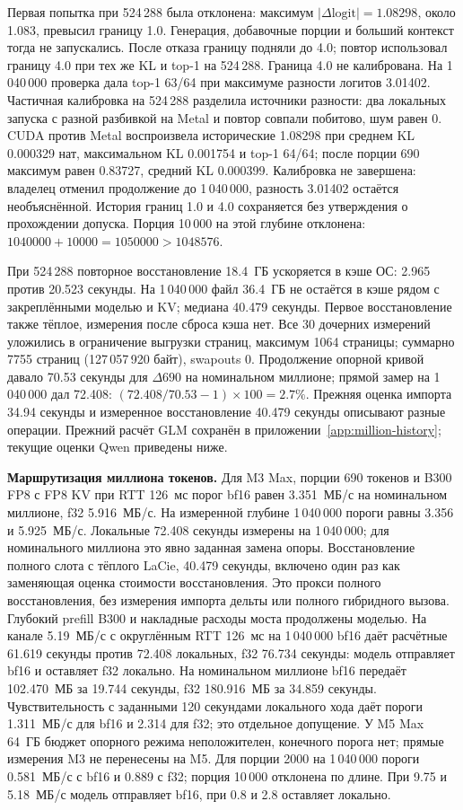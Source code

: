 Первая попытка при 524\,288 была отклонена: максимум $|\Delta\mathrm{logit}|=1.08298$, около 1.083,
превысил границу 1.0. Генерация, добавочные порции и больший контекст тогда не запускались.
После отказа границу подняли до 4.0; повтор использовал границу 4.0 при тех же KL и top-1 на 524\,288.
Граница 4.0 не калибрована. На 1\,040\,000 проверка дала top-1 63/64 при максимуме разности логитов 3.01402.
Частичная калибровка на 524\,288 разделила источники разности: два локальных запуска с разной разбивкой
на Metal и повтор совпали побитово, шум равен 0. CUDA против Metal воспроизвела исторические 1.08298
при среднем KL 0.000329 нат, максимальном KL 0.001754 и top-1 64/64;
после порции 690 максимум равен 0.83727, средний KL 0.000399.
Калибровка не завершена: владелец отменил продолжение до 1\,040\,000, разность 3.01402 остаётся необъяснённой.
История границ 1.0 и 4.0 сохраняется без утверждения о прохождении допуска.
Порция 10\,000 на этой глубине отклонена: $1040000+10000=1050000>1048576$.

При 524\,288 повторное восстановление 18.4~ГБ ускоряется в кэше ОС: 2.965 против 20.523 секунды.
На 1\,040\,000 файл 36.4~ГБ не остаётся в кэше рядом с закреплёнными моделью и KV; медиана 40.479 секунды.
Первое восстановление также тёплое, измерения после сброса кэша нет.
Все 30 дочерних измерений уложились в ограничение выгрузки страниц, максимум 1064 страницы;
суммарно 7755 страниц (127\,057\,920 байт), swapouts 0.
Продолжение опорной кривой давало 70.53 секунды для $\Delta690$ на номинальном миллионе;
прямой замер на 1\,040\,000 дал 72.408: $(72.408/70.53-1)\times100=2.7\%$.
Прежняя оценка импорта 34.94 секунды и измеренное восстановление 40.479 секунды описывают разные операции.
Прежний расчёт GLM сохранён в приложении~\ref{app:million-history}; текущие оценки Qwen приведены ниже.

\textbf{Маршрутизация миллиона токенов.} Для M3 Max, порции 690 токенов и B300 FP8 с FP8 KV
при RTT 126~мс порог bf16 равен 3.351~МБ/с на номинальном миллионе, f32 5.916~МБ/с.
На измеренной глубине 1\,040\,000 пороги равны 3.356 и 5.925~МБ/с.
Локальные 72.408 секунды измерены на 1\,040\,000; для номинального миллиона это явно заданная замена опоры.
Восстановление полного слота с тёплого LaCie, 40.479 секунды, включено один раз как заменяющая оценка стоимости восстановления.
Это прокси полного восстановления, без измерения импорта дельты или полного гибридного вызова.
Глубокий prefill B300 и накладные расходы моста продолжены моделью.
На канале 5.19~МБ/с с округлённым RTT 126~мс на 1\,040\,000 bf16 даёт расчётные 61.619 секунды против 72.408 локальных,
f32 76.734 секунды: модель отправляет bf16 и оставляет f32 локально.
На номинальном миллионе bf16 передаёт 102.470~МБ за 19.744 секунды, f32 180.916~МБ за 34.859 секунды.
Чувствительность с заданными 120 секундами локального хода даёт пороги 1.311~МБ/с для bf16 и 2.314 для f32;
это отдельное допущение. У M5 Max 64~ГБ бюджет опорного режима неположителен, конечного порога нет;
прямые измерения M3 не перенесены на M5.
Для порции 2000 на 1\,040\,000 пороги 0.581~МБ/с с bf16 и 0.889 с f32; порция 10\,000 отклонена по длине.
При 9.75 и 5.18~МБ/с модель отправляет bf16, при 0.8 и 2.8 оставляет локально.

